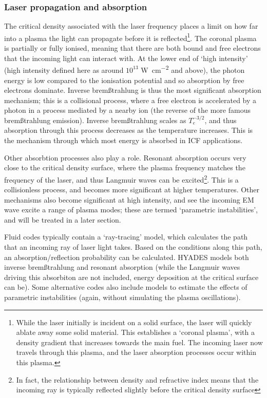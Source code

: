 \subsubsection{Laser propagation and absorption}
The critical density  associated with the laser frequency places a limit on how far into a plasma the light can propagate before it is reflected\footnote{While the laser initially is incident on a solid surface, the laser will quickly ablate away some solid material. This establishes a `coronal plasma', with a density gradient that increases towards the main fuel. The incoming laser now travels through this plasma, and the laser absorption processes occur within this plasma.}. The coronal plasma is partially or fully ionised, meaning that there are both bound and free electrons that the incoming light can interact with. At the lower end of `high intensity' (high intensity defined here as around $10^{13}$ \unit{\watt\per\centi\meter\squared} and above), the photon energy is low compared to the ionisation potential and so absorption by free electrons dominate. Inverse brem{\ss}trahlung is thus the most significant absorption mechanism; this is a collisional process, where a free electron is accelerated by a photon in a process mediated by a nearby ion (the reverse of the more famous brem{\ss}trahlung emission). Inverse brem{\ss}trahlung scales as $T_e^{-3/2}$, and thus absorption through this process decreases as the temperature increases. This is the mechanism through which most energy is absorbed in ICF applications.

Other absorbtion processes also play a role. Resonant absorption occurs very close to the critical density surface, where the plasma frequency matches the frequency of the laser, and thus Langmuir waves can be excited\footnote{In fact, the relationship between density and refractive index means that the incoming ray is typically reflected slightly before the critical density surface}. This is a collisionless process, and becomes more significant at higher temperatures. Other mechanisms also become significant at high intensity, and see the incoming EM wave excite a range of plasma modes; these are termed `parametric instabilities', and will be treated in a later section.

Fluid codes typically contain a `ray-tracing' model, which calculates the path that an incoming ray of laser light takes. Based on the conditions along this path, an absorption/reflection probability can be calculated. HYADES models both inverse brem{\ss}trahlung and resonant absorption (while the Langmuir waves driving this absorbiton are not included, energy deposition at the critical surface can be). Some alternative codes also include models to estimate the effects of parametric instabilities (again, without simulating the plasma oscillations).

